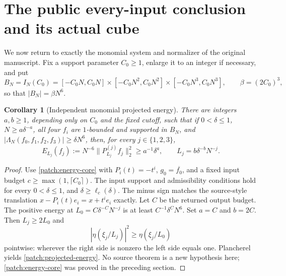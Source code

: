 \documentclass[11pt]{article}
\newtheorem{corollary}[corollary]{Corollary}
\theoremstyle{definition}
\begin{document}
\section{The public every-input conclusion and its actual cube}
\label{patch:public-completion}
We now return to exactly the monomial system and normalizer of the original manuscript.
Fix a support parameter $C_0\geq1$, enlarge it to an integer if necessary, and put
\[
 B_N=I_N(C_0)=[-C_0N,C_0N]\times[-C_0N^2,C_0N^2]\times[-C_0N^3,C_0N^3],
 \qquad\beta=(2C_0)^3,
\]
so that $|B_N|=\beta N^6$.

\begin{corollary}[Independent monomial projected energy]\label{patch:monomial-energy}
There are integers $a,b\geq1$, depending only on $C_0$ and the fixed cutoff, such that if
$0<\delta\leq1$, $N\geq a\delta^{-a}$, all four $f_i$ are $1$-bounded and supported in
$B_N$, and $|\Lambda_N(f_0,f_1,f_2,f_3)|\geq\delta N^6$, then, for every $j\in\{1,2,3\}$,
\begin{equation}\label{patch:projected-energy}
 E_{L_j}(f_j):=N^{-6}\|P_{L_j}^{(j)}f_j\|_2^2
       \geq a^{-1}\delta^a,
       \qquad L_j=b\delta^{-b}N^{-j}.
\end{equation}
\end{corollary}
\begin{proof}
Use \cref{patch:energy-core} with $P_i(t)=-t^i$, $g_0=\overline{f_0}$, and a fixed
input budget $c\geq\max(1,\lceil C_0\rceil)$.
The input support and admissibility conditions hold for every $0<\delta\leq1$, and
$\delta\geq\ell_c(\delta)$.  The minus sign matches the source-style translation
$x-P_i(t)e_i=x+t^ie_i$ exactly.
Let $C$ be the returned output budget.  The positive energy at
$L_0=C\delta^{-C}N^{-j}$ is at least $C^{-1}\delta^C N^6$.
Set $a=C$ and $b=2C$.  Then $L_j\geq2L_0$ and
\[
 |\eta(\xi_j/L_j)|^2\geq\eta(\xi_j/L_0)
\]
pointwise: wherever the right side is nonzero the left side equals one.
Plancherel yields \eqref{patch:projected-energy}.  No source theorem is a new hypothesis
here; \cref{patch:energy-core} was proved in the preceding section.
\end{proof}
\end{document}

